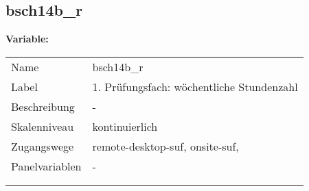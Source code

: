 	
	
	\subsection{bsch14b\_r}
	\label{subSection:bsch14b_r}

	\noindent\textbf{Variable:}\\
		\begin{tabular}{lL{11.3cm}}
			\label{tableVariable:bsch14b_r}
			Name & bsch14b\_r \\
			Label & 1. Prüfungsfach: wöchentliche Stundenzahl \\
			Beschreibung & - \\
			Skalenniveau & kontinuierlich \\
			Zugangswege &
				remote-desktop-suf,
				onsite-suf,
 \\
			Panelvariablen & -
			 \\
			 \\
 \\
		\end{tabular}





